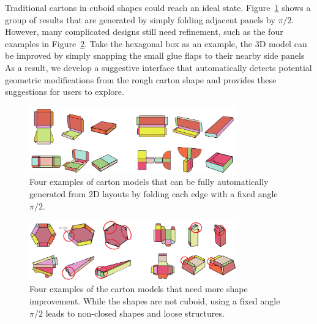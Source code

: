 Traditional cartons in cuboid shapes could reach an ideal state.
Figure~\ref{fig:initial-automatic} shows a group of results that are generated by simply folding adjacent panels by $\pi/2$.
%
However, many complicated designs still need refinement, such as the four examples in Figure~\ref{fig:initial-need-improvement}. 
Take the hexagonal box as an example, the 3D model can be improved by simply snapping the small glue flaps to their nearby side panels 
%
As a result, we develop a suggestive interface that automatically detects potential geometric modifications from the rough carton shape and provides these suggestions for users to explore.

\begin{figure}
	\centering
	\includegraphics[width=0.8\textwidth]{images/initiala}
	\caption{Four examples of carton models that can be fully automatically generated from 2D layouts by folding each edge with a fixed angle $\pi/2$. }
	\label{fig:initial-automatic}
\end{figure}

 
\begin{figure}
	\centering
	\includegraphics[width=0.8\textwidth]{images/initialb}
	\caption{Four examples of the carton models that need more shape improvement. While the shapes are not cuboid, using a fixed angle $\pi/2$ leads to non-closed shapes and loose structures.}
	\label{fig:initial-need-improvement}
\end{figure}
